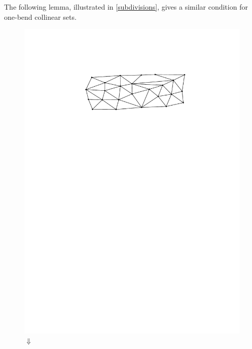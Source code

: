 \documentclass{article}
\theoremstyle{definition}
\begin{document}
The following lemma, illustrated in \cref{subdivisions}, gives a similar condition for one-bend collinear sets.

\begin{figure} [htbp]
  \centering
  \includegraphics[page=6]{figs/proper_good} \\
  $\Downarrow$ \\

\end{figure}
\end{document}
